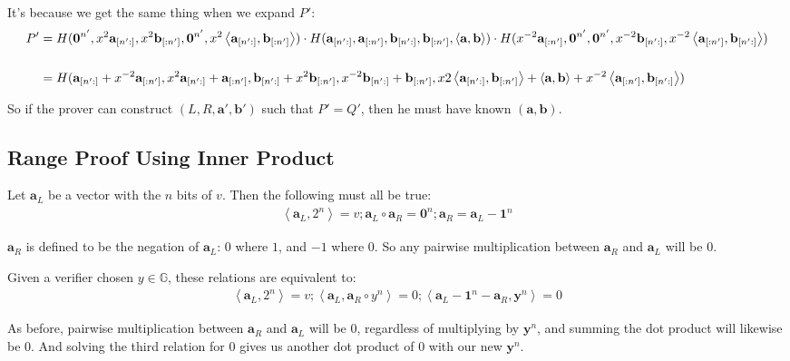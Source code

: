 \documentclass{article}
\begin{document}
It's because we get the same thing when we expand $P'$:
\begin{align}
  P' &= H(\textbf{0}^{n'}, x^2 \textbf{a}_{[n':]}, x^2 \textbf{b}_{[:n']}, \textbf{0}^{n'}, x^2 \left<\textbf{a}_{[n':]}, \textbf{b}_{[:n']}\right>) \cdot H(\textbf{a}_{[n':]}, \textbf{a}_{[:n']}, \textbf{b}_{[n':]}, \textbf{b}_{[:n']}, \left<\textbf{a}, \textbf{b}\right>) \cdot H(x^{-2} \textbf{a}_{[:n']}, \textbf{0}^{n'}, \textbf{0}^{n'}, x^{-2} \textbf{b}_{[n':]}, x^{-2} \left<\textbf{a}_{[:n']}, \textbf{b}_{[n':]}\right>)\\
  \cr &= H(\textbf{a}_{[n':]} + x^{-2} \textbf{a}_{[:n']}, x^2 \textbf{a}_{[n':]} + \textbf{a}_{[:n']}, \textbf{b}_{[n':]} + x^2 \textbf{b}_{[:n']}, x^{-2} \textbf{b}_{[n':]} + \textbf{b}_{[:n']}, x2 \left<\textbf{a}_{[n':]}, \textbf{b}_{[:n']}\right> + \left<\textbf{a}, \textbf{b}\right> + x^{-2} \left<\textbf{a}_{[:n']}, \textbf{b}_{[n':]}\right>)
\end{align}

So if the prover can construct $(L, R, \textbf{a}', \textbf{b}')$ such that $P' = Q'$, then he must have known $(\textbf{a}, \textbf{b})$.


\subsection{Range Proof Using Inner Product}

Let $\textbf{a}_L$ be a vector with the $n$ bits of $v$.  Then the following must all be true:
\begin{align}
  \left<\textbf{a}_L, 2^n\right> = v ; \textbf{a}_L \circ  \textbf{a}_R = \textbf{0}^n ; \textbf{a}_R = \textbf{a}_L - \textbf{1}^n
\end{align}
  
$\textbf{a}_R$ is defined to be the negation of $\textbf{a}_L$: $0$ where $1$, and $-1$ where $0$.  So any pairwise multiplication between $\textbf{a}_R$ and $\textbf{a}_L$ will be $0$.

Given a verifier chosen $y \in \mathbb{G}$, these relations are equivalent to:
\begin{align}
  \left<\textbf{a}_L, 2^n\right> = v ; \left<\textbf{a}_L, \textbf{a}_R \circ y^n\right> = 0 ; \left<\textbf{a}_L - \textbf{1}^n - \textbf{a}_R, \textbf{y}^n\right> = 0
\end{align}

As before, pairwise multiplication between $\textbf{a}_R$ and $\textbf{a}_L$ will be $0$, regardless of multiplying by $\textbf{y}^n$, and summing the dot product will likewise be $0$. And solving the third relation for $0$ gives us another dot product of $0$ with our new $\textbf{y}^n$.
\end{document}
